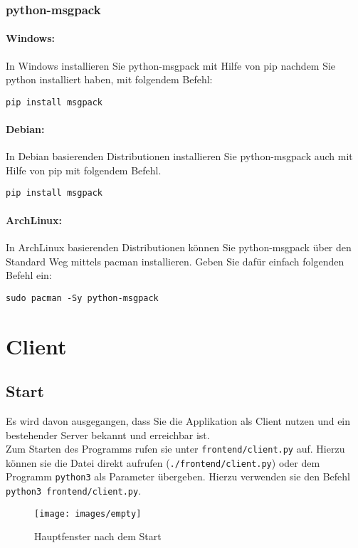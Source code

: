 \documentclass[a4paper,ngerman,headsepline, titlepage=firstiscover]{scrartcl}
\begin{document}
\subsubsection{python-msgpack}
\paragraph{Windows:} In Windows installieren Sie python-msgpack mit Hilfe von pip nachdem Sie python installiert haben, mit folgendem Befehl:
\begin{lstlisting}[style=simple]
 pip install msgpack
\end{lstlisting}

\paragraph{Debian:} In Debian basierenden Distributionen installieren Sie python-msgpack auch mit Hilfe von pip mit folgendem Befehl.
\begin{lstlisting}[style=simple]
 pip install msgpack
\end{lstlisting}

\paragraph{ArchLinux:} In ArchLinux basierenden Distributionen können Sie python-msgpack über den Standard Weg mittels pacman installieren. Geben Sie dafür einfach folgenden Befehl ein:
\begin{lstlisting}[style=simple]
 sudo pacman -Sy python-msgpack
\end{lstlisting}
\newpage
\section{Client}
\subsection{Start}
Es wird davon ausgegangen, dass Sie die Applikation als Client nutzen und ein bestehender Server bekannt und erreichbar ist.\\
Zum Starten des Programms rufen sie unter \texttt{frontend/client.py} auf. Hierzu können sie die Datei direkt aufrufen (\texttt{./frontend/client.py}) oder dem Programm \texttt{python3} als Parameter übergeben. Hierzu verwenden sie den Befehl \texttt{python3 frontend/client.py}.

\begin{figure}[!h]\centering
\texttt{[image: images/empty]}
\caption{Hauptfenster nach dem Start}
\end{figure}
\end{document}
